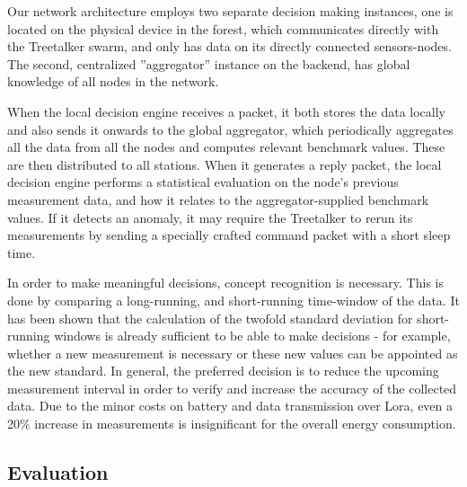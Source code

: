 
Our network architecture employs two separate decision making instances, one is located on the physical device in the forest, which communicates directly with the Treetalker swarm, and only has data on its directly connected sensors-nodes.
The second, centralized ''aggregator'' instance on the backend, has global knowledge of all nodes in the network.

When the local decision engine receives a packet, it both stores the data locally and also sends it onwards to the global aggregator, which periodically aggregates all the data from all the nodes and computes relevant benchmark values. 
These are then distributed to all stations.
When it generates a reply packet, the local decision engine performs a statistical evaluation on the node's previous measurement data, and how it relates to the aggregator-supplied benchmark values.
If it detects an anomaly, it may require the Treetalker to rerun its measurements by sending a specially crafted command packet with a short sleep time.

In order to make meaningful decisions, concept recognition is necessary.
This is done by comparing a long-running, and short-running time-window of the data.
It has been shown that the calculation of the twofold standard deviation for short-running windows is already sufficient to be able to make decisions - for example, whether a new measurement is necessary or these new values can be appointed as the new standard.
In general, the preferred decision is to reduce the upcoming measurement interval in order to verify and increase the accuracy of the collected data.
Due to the minor costs on battery and data transmission over Lora, even a 20\% increase in measurements is insignificant for the overall energy consumption. 

\subsection{Evaluation}
\label{sec:treetalker:evaluation}

